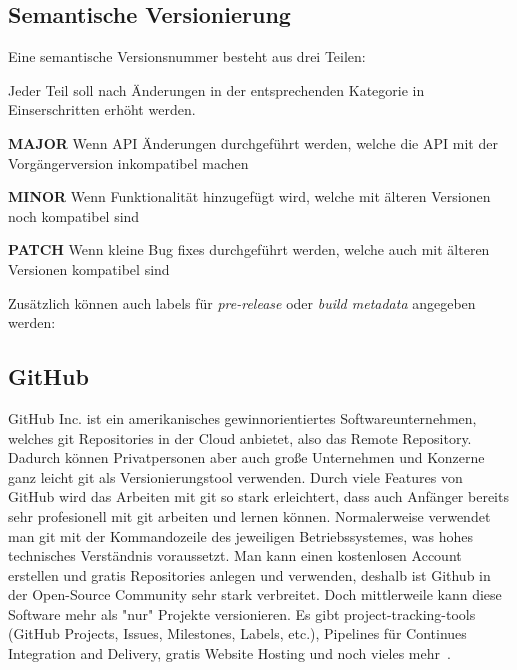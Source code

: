 \cite{git-workflow}

\subsection{Semantische Versionierung}
\label{subsec:semantic-versioning}
Eine semantische Versionsnummer besteht aus drei Teilen:

\begin{center}
\end{center}

Jeder Teil soll nach Änderungen in der entsprechenden Kategorie in Einserschritten erhöht werden.

\textbf{MAJOR}
Wenn API Änderungen durchgeführt werden, welche die API mit der Vorgängerversion inkompatibel machen
\linebreak

\textbf{MINOR}
Wenn Funktionalität hinzugefügt wird, welche mit älteren Versionen noch kompatibel sind
\linebreak

\textbf{PATCH}
Wenn kleine Bug fixes durchgeführt werden, welche auch mit älteren Versionen kompatibel sind
\linebreak

Zusätzlich können auch labels für \emph{pre-release} oder \emph{build metadata} angegeben werden:

\begin{center}
\end{center}

\cite{semantische-versionierung}

\subsection{GitHub}\label{subsec:github}
GitHub Inc. ist ein amerikanisches gewinnorientiertes Softwareunternehmen, welches git Repositories in der Cloud anbietet,
also das Remote Repository.
Dadurch können Privatpersonen aber auch große Unternehmen und Konzerne ganz leicht git als Versionierungstool verwenden.
Durch viele Features von GitHub wird das Arbeiten mit git so stark erleichtert, dass auch Anfänger bereits sehr profesionell
mit git arbeiten und lernen können.
Normalerweise verwendet man git mit der Kommandozeile des jeweiligen Betriebssystemes, was hohes technisches Verständnis voraussetzt.
Man kann einen kostenlosen Account erstellen und gratis Repositories anlegen und verwenden,
deshalb ist Github in der Open-Source Community sehr stark verbreitet.
Doch mittlerweile kann diese Software mehr als "nur" Projekte versionieren.
Es gibt project-tracking-tools (GitHub Projects, Issues, Milestones, Labels, etc.), Pipelines für Continues Integration and Delivery,
gratis Website Hosting und noch vieles mehr~\cite{github-features}.

